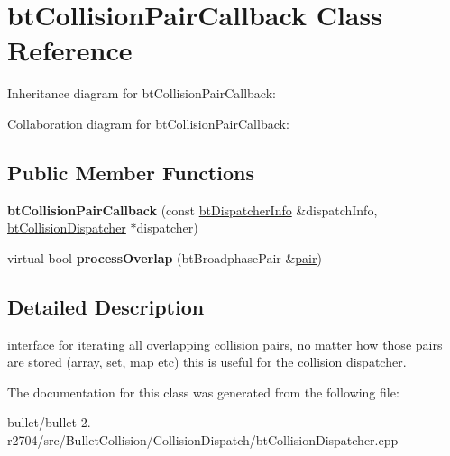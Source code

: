 \hypertarget{classbt_collision_pair_callback}{\section{bt\+Collision\+Pair\+Callback Class Reference}
\label{classbt_collision_pair_callback}
}


Inheritance diagram for bt\+Collision\+Pair\+Callback\+:


Collaboration diagram for bt\+Collision\+Pair\+Callback\+:
\subsection*{Public Member Functions}
\begin{DoxyCompactItemize}
\item 
\hypertarget{classbt_collision_pair_callback_ac7ffa05c87dac7a222237382814a737f}{{\bfseries bt\+Collision\+Pair\+Callback} (const \hyperlink{structbt_dispatcher_info}{bt\+Dispatcher\+Info} \&dispatch\+Info, \hyperlink{classbt_collision_dispatcher}{bt\+Collision\+Dispatcher} $\ast$dispatcher)}\label{classbt_collision_pair_callback_ac7ffa05c87dac7a222237382814a737f}

\item 
\hypertarget{classbt_collision_pair_callback_a6a38dbec8b50c4587a8c8be41b705048}{virtual bool {\bfseries process\+Overlap} (bt\+Broadphase\+Pair \&\hyperlink{structpair}{pair})}\label{classbt_collision_pair_callback_a6a38dbec8b50c4587a8c8be41b705048}

\end{DoxyCompactItemize}


\subsection{Detailed Description}
interface for iterating all overlapping collision pairs, no matter how those pairs are stored (array, set, map etc) this is useful for the collision dispatcher. 

The documentation for this class was generated from the following file\+:\begin{DoxyCompactItemize}
\item 
bullet/bullet-\/2.-\/r2704/src/\+Bullet\+Collision/\+Collision\+Dispatch/bt\+Collision\+Dispatcher.\+cpp\end{DoxyCompactItemize}
